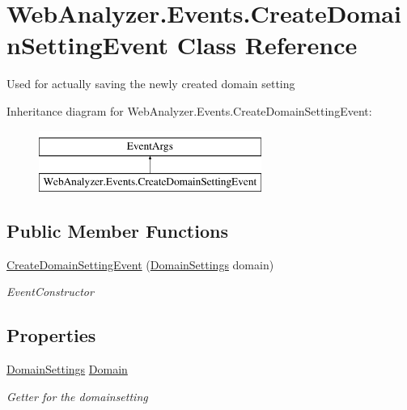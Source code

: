 \hypertarget{class_web_analyzer_1_1_events_1_1_create_domain_setting_event}{}\section{Web\+Analyzer.\+Events.\+Create\+Domain\+Setting\+Event Class Reference}
\label{class_web_analyzer_1_1_events_1_1_create_domain_setting_event}


Used for actually saving the newly created domain setting  


Inheritance diagram for Web\+Analyzer.\+Events.\+Create\+Domain\+Setting\+Event\+:\begin{figure}[H]
\begin{center}
\leavevmode
\includegraphics[height=2.000000cm]{class_web_analyzer_1_1_events_1_1_create_domain_setting_event}
\end{center}
\end{figure}
\subsection*{Public Member Functions}
\begin{DoxyCompactItemize}
\item 
\hyperlink{class_web_analyzer_1_1_events_1_1_create_domain_setting_event_ab1fc9b02080ecdb86b4a7f35fca4c407}{Create\+Domain\+Setting\+Event} (\hyperlink{class_web_analyzer_1_1_models_1_1_settings_model_1_1_domain_settings}{Domain\+Settings} domain)
\begin{DoxyCompactList}\small\item\em Event\+Constructor \end{DoxyCompactList}\end{DoxyCompactItemize}
\subsection*{Properties}
\begin{DoxyCompactItemize}
\item 
\hyperlink{class_web_analyzer_1_1_models_1_1_settings_model_1_1_domain_settings}{Domain\+Settings} \hyperlink{class_web_analyzer_1_1_events_1_1_create_domain_setting_event_a38563439a3da6789afcb3dc1e3fb30e3}{Domain}
\begin{DoxyCompactList}\small\item\em Getter for the domainsetting \end{DoxyCompactList}\end{DoxyCompactItemize}
